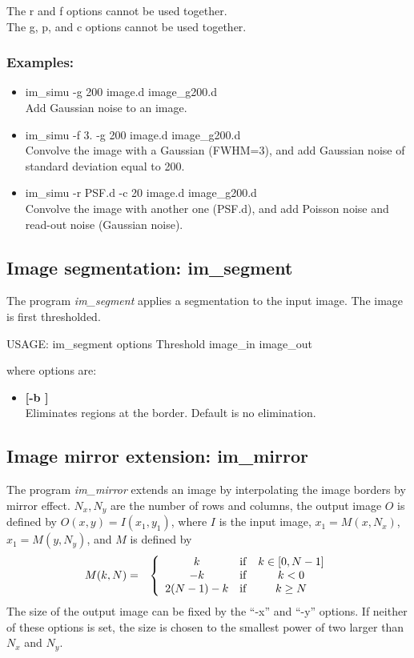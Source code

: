 The r and f options cannot be used together. \\
The g, p, and c options cannot be used together. \\
\subsubsection*{Examples:}
\begin{itemize}
\item im\_simu -g 200 image.d image\_g200.d \\
Add Gaussian noise to an image.
\item im\_simu -f 3. -g 200 image.d image\_g200.d \\
Convolve the image with a Gaussian (FWHM=3), and add Gaussian noise of
standard deviation equal to 200.
\item im\_simu -r PSF.d -c 20 image.d image\_g200.d \\
Convolve the image with another one (PSF.d), and add Poisson
noise and read-out noise (Gaussian noise).
\end{itemize}

\subsection{Image segmentation: im\_segment}

The program 
{\em im\_segment} applies a segmentation to the input image. The 
image is first thresholded.
{\bf 
\begin{center}
USAGE: im\_segment options Threshold image\_in image\_out
\end{center}}
where options are:
\begin{itemize}
\item {\bf[-b ]} \\Eliminates regions at the border. Default is no elimination.
\end{itemize}


\subsection{Image mirror extension: im\_mirror}

The program {\em im\_mirror} extends an image by interpolating the image borders
by mirror effect. $N_x,N_y$ are the number of rows and columns, the
output image $O$ is defined by $O(x,y) = I(x_1,y_1)$, where
$I$ is the input image,
 $x_1 = M(x, N_x)$, $x_1 = M(y, N_y)$, and  $M$ is defined by
\begin{eqnarray*}
M(k,N) & = & \left\{  \begin{array}{ccc}
   k & {\rm if } & k \in [0,N-1] \\
   -k & {\rm if } & k < 0 \\
   2(N-1)-k & {\rm if } & k \ge N 
\end{array}\right. 
\end{eqnarray*}
The size of the output image can be fixed by the ``-x'' and ``-y'' options.
If neither of these options is set, the size is chosen to the smallest
power of two larger than $N_x$ and $N_y$. \\

